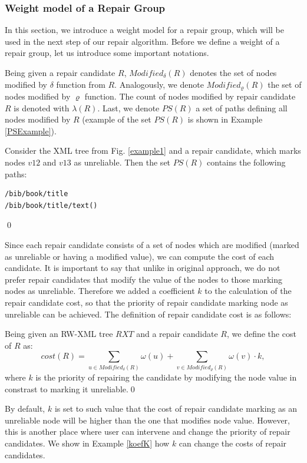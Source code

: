 \subsubsection{Weight model of a Repair Group}

In this section, we introduce a weight model for a repair group, which will be used in the next step of our repair algorithm. Before we define a weight of a repair group, let us introduce some important notations.

Being given a repair candidate $R$, $Modified_\delta(R)$ denotes the set of nodes modified by $\delta$ function from $R$. Analogously, we denote $Modified_\varrho(R)$ the set of nodes modified by $\varrho$ function. The count of nodes modified by repair candidate $R$ is denoted with $\lambda(R)$. Last, we denote $PS(R)$ a set of paths defining all nodes modified by $R$ (example of the set $PS(R)$ is shown in Example \ref{PSExample}).

\begin{example}\label{PSExample}
Consider the XML tree from Fig. \ref{example1} and a repair candidate, which marks nodes $v12$ and $v13$ as unreliable. Then the set $PS(R)$ contains the following paths:
\begin{verbatim}
/bib/book/title
/bib/book/title/text()
\end{verbatim}\qed
\end{example}


Since each repair candidate consists of a set of nodes which are modified (marked as unreliable or having a modified value), we can compute the cost of each candidate. It is important to say that unlike in original approach, we do not prefer repair candidates that modify the value of the nodes to those marking nodes as unreliable. Therefore we added a coefficient $k$ to the calculation of the repair candidate cost, so that the priority of repair candidate marking node as unreliable can be achieved. The definition of repair candidate cost is as follows:

\begin{define}
Being given an RW-XML tree $RXT$ and a repair candidate $R$, we define the cost of $R$ as:
$$cost(R) = \sum_{u \in Modified_\delta(R)} \omega(u) + \sum_{v \in Modified_\varrho(R)} \omega(v) \cdot k,$$
where $k$ is the priority of repairing the candidate by modifying the node value in constrast to marking it unreliable.\qed
\end{define}

By default, $k$ is set to such value that the cost of repair candidate marking as an unreliable node will be higher than the one that modifies node value. However, this is another place where user can intervene and change the priority of repair candidates. We show in Example \ref{koefK} how $k$ can change the costs of repair candidates.

